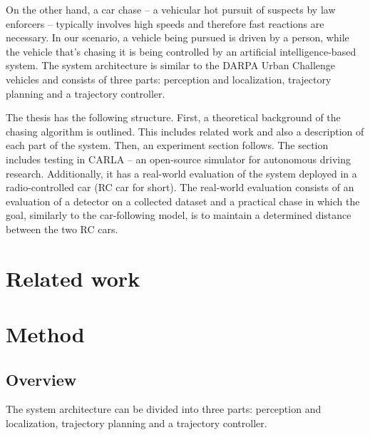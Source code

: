  
On the other hand, a car chase -- a vehicular hot pursuit of suspects by law enforcers -- typically involves high speeds and therefore fast reactions are necessary. In our scenario, a vehicle being pursued is driven by a person, while the vehicle that's chasing it is being controlled by an artificial intelligence-based system. The system architecture is similar to the DARPA Urban Challenge vehicles \cite{Bertha}\cite{darpa2}\cite{darpa_book} and consists of three parts: perception and localization, trajectory planning and a trajectory controller. \par


The thesis has the following structure. First, a theoretical background of the chasing algorithm is outlined. This includes related work and also a description of each part of the system. Then, an experiment section follows. The section includes testing in CARLA -- an open-source simulator for autonomous driving research. Additionally, it has a real-world evaluation of the system deployed in a radio-controlled car (RC car for short). The real-world evaluation consists of an evaluation of a detector on a collected dataset and a practical chase in which the goal, similarly to the car-following model, is to maintain a determined distance between the two RC cars.




\chapter{Related work}




\chapter{Method}
\section{Overview}
The system architecture can be divided into three parts: perception and localization, trajectory planning and a trajectory controller.\par



